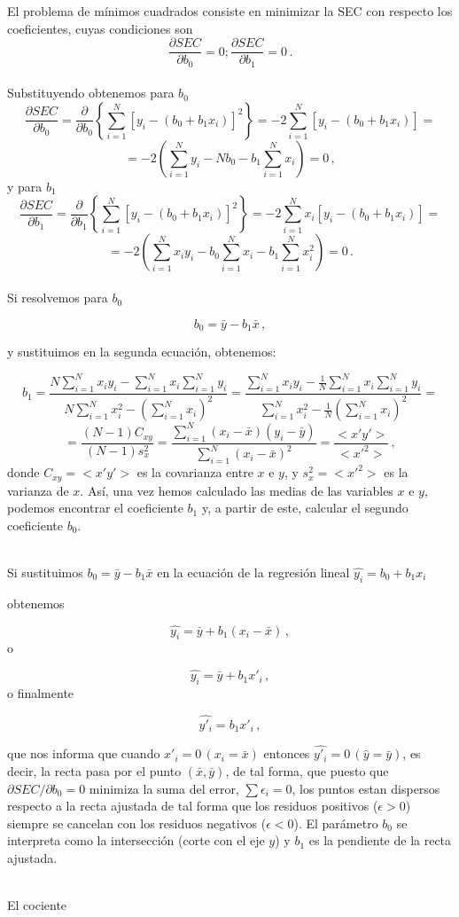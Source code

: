 \documentclass[
]{agujournal2019}
\begin{document}
\noindent El problema de mínimos cuadrados consiste en minimizar la SEC
con respecto los coeficientes, cuyas condiciones son
\[\frac{\partial{SEC}}{\partial{b_0}}=0; \frac{\partial{SEC}}{\partial{b_1}}=0\,.\]\\

\noindent Substituyendo obtenemos para \(b_0\)
\[\frac{\partial{SEC}}{\partial{b_0}} =\frac{\partial}{\partial{b_0}}
  \left\{
    \sum^N_{i=1} [y_i - (b_0+b_1 x_i)]^2
  \right\}=
  -2\sum^N_{i=1} [y_i - (b_0+b_1 x_i)]=\]
\[=-2\left(\sum^N_{i=1}y_i -N b_0 - b_1\sum^N_{i=1} x_i  \right)=0\,,\]
y para \(b_1\)
\[\frac{\partial{SEC}}{\partial{b_1}} =\frac{\partial{}}{\partial{b_1}}
  \left\{
    \sum^N_{i=1} [y_i - (b_0+b_1 x_i)]^2
  \right\}=
  -2\sum^N_{i=1} x_i [y_i - (b_0+b_1 x_i)]=\]
\[=-2\left(\sum^N_{i=1}x_i y_i - b_0\sum^N_{i=1}x_i - b_1\sum^N_{i=1} x^2_i \right)=0\,.\]\\

\noindent Si resolvemos para \(b_0\)

\[b_0=\bar{y}-b_1\bar{x}\,,\]

y sustituimos en la segunda ecuación, obtenemos:

\[b_1=\frac{N \sum\limits^N_{i=1} x_i y_i - \sum\limits^N_{i=1}x_i \sum\limits^N_{i=1}y_i}
           {N\sum\limits^N_{i=1}x^2_i-\left(\sum\limits^N_{i=1}x_i \right)^2}=
      \frac{\sum\limits^N_{i=1} x_i y_i - \frac{1}{N}\sum\limits^N_{i=1}x_i \sum\limits^N_{i=1}y_i}
           {\sum\limits^N_{i=1}x^2_i-\frac{1}{N}\left(\sum\limits^N_{i=1}x_i \right)^2}=\]
\[=\frac{(N-1)C_{xy}}{(N-1)s^2_x}=\frac{\sum\limits^N_{i=1} (x_i-\bar{x})(y_i-\bar{y})}
                                      {\sum\limits^N_{i=1} (x_i-\bar{x})^2}=\frac{<x'y'>}{<x'^2>}\,,\]
donde \(C_{xy}=<x'y'>\) es la covarianza entre \(x\) e \(y\), y
\(s^2_x=<x'^2>\) es la varianza de \(x\). Así, una vez hemos calculado
las medias de las variables \(x\) e \(y\), podemos encontrar el
coeficiente \(b_1\) y, a partir de este, calcular el segundo coeficiente
\(b_0\).\\
\strut \\
\noindent Si sustituimos \(b_0=\bar{y}-b_1\bar{x}\) en la ecuación de la
regresión lineal \(\hat{y_i}=b_0+b_1 x_i\)

obtenemos

\[\hat{y_i}=\bar{y} +b_1(x_i-\bar{x})\,,\] o

\[\hat{y_i}=\bar{y} +b_1{x'_i}\,,\] o finalmente

\[\hat{y'_i}=b_1{x'_i}\,,\]

que nos informa que cuando \(x'_i=0\,(x_i=\bar{x})\) entonces
\(\hat{y'_i}=0 \,(\hat{y}=\bar{y})\), es decir, la recta pasa por el
punto \((\bar{x},\bar{y})\), de tal forma, que puesto que
\(\partial{SEC}/{\partial{b_0}}=0\) minimiza la suma del error,
\(\sum \epsilon_i=0\), los puntos estan dispersos respecto a la recta
ajustada de tal forma que los residuos positivos (\(\epsilon>0\))
siempre se cancelan con los residuos negativos (\(\epsilon<0\)). El
parámetro \(b_0\) se interpreta como la intersección (corte con el eje
\(y\)) y \(b_1\) es la pendiente de la recta ajustada.\\
\strut \\
\noindent El cociente
\end{document}

